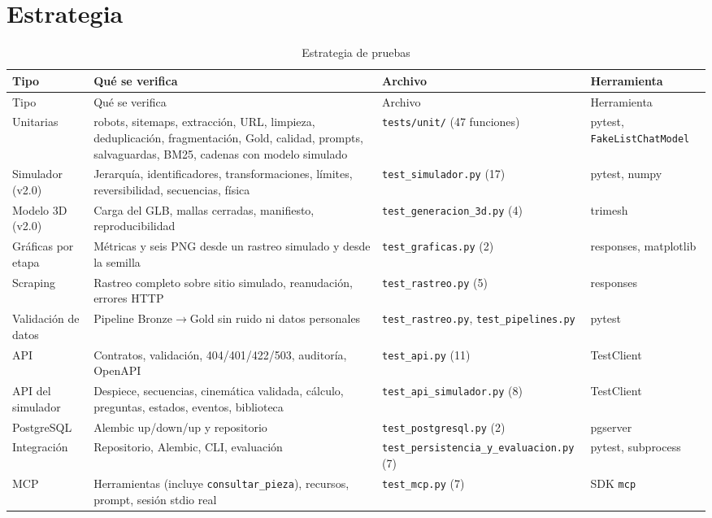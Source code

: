 \section{Estrategia}
\begin{longtable}{@{}P{2.6cm}P{5.6cm}P{3.6cm}P{3.2cm}@{}}
\caption{Estrategia de pruebas}\label{tab:estrategia}\\\toprule
Tipo & Qué se verifica & Archivo & Herramienta\\\midrule\endfirsthead
\toprule Tipo & Qué se verifica & Archivo & Herramienta\\\midrule\endhead
Unitarias & robots, sitemaps, extracción, URL, limpieza, deduplicación, fragmentación, Gold, calidad, prompts,
salvaguardas, BM25, cadenas con modelo simulado & \texttt{tests/unit/} (47 funciones) & pytest, \texttt{FakeListChatModel}\\
Simulador (v2.0) & Jerarquía, identificadores, transformaciones, límites, reversibilidad, secuencias, física & \texttt{test\_simulador.py} (17) & pytest, numpy\\
Modelo 3D (v2.0) & Carga del GLB, mallas cerradas, manifiesto, reproducibilidad & \texttt{test\_generacion\_3d.py} (4) & trimesh\\
Gráficas por etapa & Métricas y seis PNG desde un rastreo simulado y desde la semilla & \texttt{test\_graficas.py} (2) & responses, matplotlib\\
Scraping & Rastreo completo sobre sitio simulado, reanudación, errores HTTP & \texttt{test\_rastreo.py} (5) & responses\\
Validación de datos & Pipeline Bronze$\rightarrow$Gold sin ruido ni datos personales & \texttt{test\_rastreo.py}, \texttt{test\_pipelines.py} & pytest\\
API & Contratos, validación, 404/401/422/503, auditoría, OpenAPI & \texttt{test\_api.py} (11) & TestClient\\
API del simulador & Despiece, secuencias, cinemática validada, cálculo, preguntas, estados, eventos, biblioteca & \texttt{test\_api\_simulador.py} (8) & TestClient\\
PostgreSQL & Alembic up/down/up y repositorio & \texttt{test\_postgresql.py} (2) & pgserver\\
Integración & Repositorio, Alembic, CLI, evaluación & \texttt{test\_persistencia\_y\_evaluacion.py} (7) & pytest, subprocess\\
MCP & Herramientas (incluye \texttt{consultar\_pieza}), recursos, prompt, sesión stdio real & \texttt{test\_mcp.py} (7) & SDK \texttt{mcp}\\

\end{longtable}
